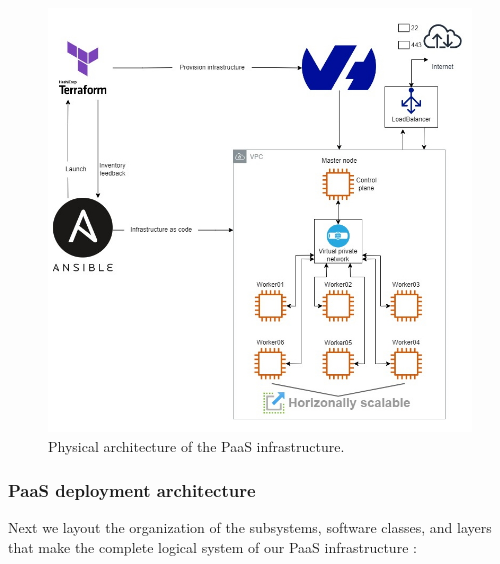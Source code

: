 \begin{figure}[H]\centering
\includegraphics[width=1.0\textwidth,angle=00]{assets/f7.jpg}
\caption{Physical architecture of the PaaS infrastructure.}
\label{fig:f7}
\end{figure}

\newpage

\subsubsection{PaaS deployment architecture} 
\hspace{7mm}Next we layout the organization of the subsystems, software classes, and layers that make the complete logical system of our PaaS infrastructure :


